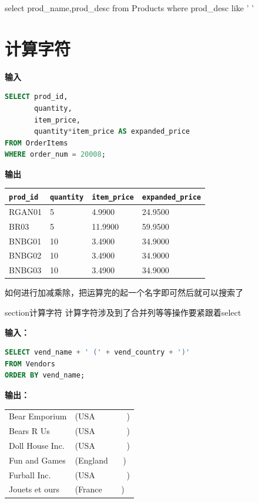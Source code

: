 \begin{dxtips}
    select prod_name,prod_desc from Products where prod_desc like '%
    '%
\end{dxtips}
\section{计算字符}
\textbf{输入}
\begin{lstlisting}[language=SQL]
SELECT prod_id,
       quantity,
       item_price,
       quantity*item_price AS expanded_price
FROM OrderItems
WHERE order_num = 20008;
\end{lstlisting}

\textbf{输出}
\begin{center}
    \begin{tabular}{llll}
        \texttt{prod\_id} & \texttt{quantity} & \texttt{item\_price} & \texttt{expanded\_price} \\
        \hline
        RGAN01 & 5 & 4.9900 & 24.9500 \\
        BR03   & 5 & 11.9900 & 59.9500 \\
        BNBG01 & 10 & 3.4900 & 34.9000 \\
        BNBG02 & 10 & 3.4900 & 34.9000 \\
        BNBG03 & 10 & 3.4900 & 34.9000 \\
    \end{tabular}
\end{center}
\begin{dxtips}
  如何进行加减乘除，把运算完的起一个名字即可然后就可以搜索了  
\end{dxtips}
section{计算字符}
计算字符涉及到了合并列等等操作要紧跟着select


    \textbf{输入：}
\begin{lstlisting}[language=SQL]
SELECT vend_name + ' (' + vend_country + ')'
FROM Vendors
ORDER BY vend_name;
\end{lstlisting}

    \textbf{输出：}
    \begin{center}
    \begin{tabular}{ll}
    \hline
    Bear Emporium & (USA \ \ \ \ \ \ \ ) \\
    Bears R Us & (USA \ \ \ \ \ \ \ ) \\
    Doll House Inc. & (USA \ \ \ \ \ \ \ ) \\
    Fun and Games & (England \ \ \ ) \\
    Furball Inc. & (USA \ \ \ \ \ \ \ ) \\
    Jouets et ours & (France \ \ \ \ ) \\
    \hline
    \end{tabular}
    \end{center}

